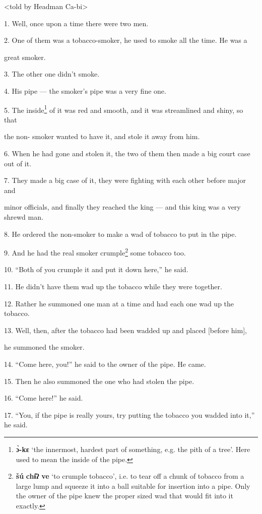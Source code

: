 \setcounter{footnote}{0}

<told by Headman Ca-bi>

1. Well, once upon a time there were two men.

2. One of them was a tobacco-smoker, he used to smoke all the time. He was a


great smoker.

3. The other one didn't smoke.

4. His pipe --- the smoker's pipe was a very fine one.

5. The inside\footnote{\textbf{ɔ̀-kɛ} `the innermost, hardest part of something, e.g. the pith of a tree'. Here used to mean the inside of the pipe.} of it was red and smooth, and it was streamlined and shiny, so
that

the non- smoker wanted to have it, and stole it away from him.

6. When he had gone and stolen it, the two of them then made a big court case out
of it.

7. They made a big case of it, they were fighting with each other before major
and

minor officials, and finally they reached the king --- and this king was a very
shrewd man.

8. He ordered the non-smoker to make a wad of tobacco to put in the pipe.

9. And he had the real smoker crumple\footnote{\textbf{šú} \textbf{chɨ̂ʔ} \textbf{ve} `to crumple tobacco', i.e. to tear off a chunk of tobacco from a large lump and squeeze it into a ball suitable for insertion into a pipe. Only the owner of the pipe knew the proper sized wad that would fit into it exactly.} some tobacco too.

10. ``Both of you crumple it and put it down here,'' he said.

11. He didn't have them wad up the tobacco while they were together.

12. Rather he summoned one man at a time and had each one wad up the tobacco.

13. Well, then, after the tobacco had been wadded up and placed [before him],


he summoned the smoker.

14. ``Come here, you!'' he said to the owner of the pipe. He came.

15. Then he also summoned the one who had stolen the pipe.

16. ``Come here!'' he said.

17. ``You, if the pipe is really yours, try putting the tobacco you wadded into
it,'' he said.

